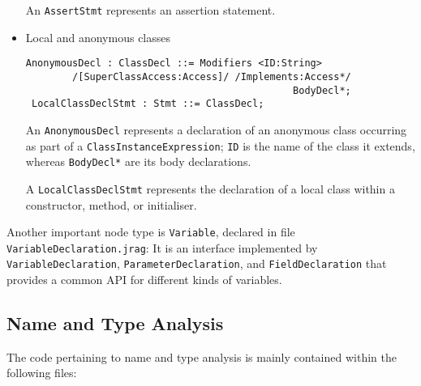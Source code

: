 \documentclass{article}
\newcommand{\file}[1]{\texttt{#1}}
\newcommand{\nt}[1]{\texttt{#1}}
\begin{document}
\begin{itemize}
  An \nt{AssertStmt} represents an assertion statement.

\item Local and anonymous classes
  \begin{lstlisting}[frame=single]
 AnonymousDecl : ClassDecl ::= Modifiers <ID:String> 
        /[SuperClassAccess:Access]/ /Implements:Access*/ 
                                              BodyDecl*;
 LocalClassDeclStmt : Stmt ::= ClassDecl;
  \end{lstlisting}

  An \nt{AnonymousDecl} represents a declaration of an anonymous
  class occurring as part of a \nt{ClassInstanceExpression}; 
  \nt{ID} is the name of the class it extends, whereas
  \nt{BodyDecl*} are its body declarations.

  A \nt{LocalClassDeclStmt} represents the declaration of a local
  class within a constructor, method, or initialiser.
\end{itemize}

Another important node type is \nt{Variable}, declared in file\linebreak
\file{VariableDeclaration.jrag}: It is an interface implemented by\linebreak
 \nt{VariableDeclaration}, \nt{ParameterDeclaration}, and 
\nt{FieldDeclaration} that provides a common API for different kinds of
variables.

\subsection{Name and Type Analysis}

The code pertaining to name and type analysis is mainly contained within
the following files:
\end{document}
